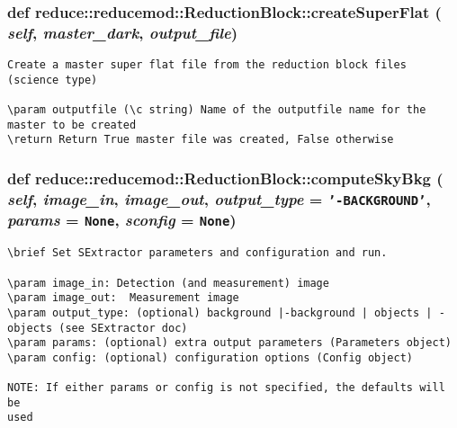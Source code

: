 \subsubsection{\setlength{\rightskip}{0pt plus 5cm}def reduce::reducemod::Reduction\-Block::create\-Super\-Flat ( {\em self},  {\em master\_\-dark},  {\em output\_\-file})}\label{classreduce_1_1reducemod_1_1ReductionBlock_91f269f292d6724b0f585cf7ed4026cb}




\footnotesize\begin{verbatim}
Create a master super flat file from the reduction block files (science type)

\param outputfile (\c string) Name of the outputfile name for the master to be created
\return Return True master file was created, False otherwise
\end{verbatim}
\normalsize
\subsubsection{\setlength{\rightskip}{0pt plus 5cm}def reduce::reducemod::Reduction\-Block::compute\-Sky\-Bkg ( {\em self},  {\em image\_\-in},  {\em image\_\-out},  {\em output\_\-type} = {\tt '-BACKGROUND'},  {\em params} = {\tt None},  {\em sconfig} = {\tt None})}\label{classreduce_1_1reducemod_1_1ReductionBlock_e16b6cd5402975065b0b87b04a12786d}




\footnotesize\begin{verbatim}
\brief Set SExtractor parameters and configuration and run.

\param image_in: Detection (and measurement) image
\param image_out:  Measurement image
\param output_type: (optional) background |-background | objects | -objects (see SExtractor doc)
\param params: (optional) extra output parameters (Parameters object)
\param config: (optional) configuration options (Config object)

NOTE: If either params or config is not specified, the defaults will be
used
\end{verbatim}
\normalsize
